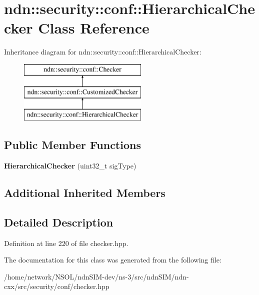 \hypertarget{classndn_1_1security_1_1conf_1_1HierarchicalChecker}{}\section{ndn\+:\+:security\+:\+:conf\+:\+:Hierarchical\+Checker Class Reference}
\label{classndn_1_1security_1_1conf_1_1HierarchicalChecker}
Inheritance diagram for ndn\+:\+:security\+:\+:conf\+:\+:Hierarchical\+Checker\+:\begin{figure}[H]
\begin{center}
\leavevmode
\includegraphics[height=3.000000cm]{classndn_1_1security_1_1conf_1_1HierarchicalChecker}
\end{center}
\end{figure}
\subsection*{Public Member Functions}
\begin{DoxyCompactItemize}
\item 
{\bfseries Hierarchical\+Checker} (uint32\+\_\+t sig\+Type)\hypertarget{classndn_1_1security_1_1conf_1_1HierarchicalChecker_adf28dc3c5a717c9028db1bd08d02941e}{}\label{classndn_1_1security_1_1conf_1_1HierarchicalChecker_adf28dc3c5a717c9028db1bd08d02941e}

\end{DoxyCompactItemize}
\subsection*{Additional Inherited Members}


\subsection{Detailed Description}


Definition at line 220 of file checker.\+hpp.



The documentation for this class was generated from the following file\+:\begin{DoxyCompactItemize}
\item 
/home/network/\+N\+S\+O\+L/ndn\+S\+I\+M-\/dev/ns-\/3/src/ndn\+S\+I\+M/ndn-\/cxx/src/security/conf/checker.\+hpp\end{DoxyCompactItemize}
